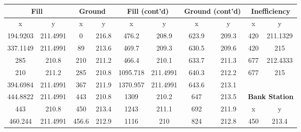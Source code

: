 \begin{center}
\begin{tabular}{|cccc||cccc||cc|} 
    \hline
    \multicolumn{2}{|c}{\textbf{Fill}} & \multicolumn{2}{c||}{\textbf{Ground}} & \multicolumn{2}{c}{\textbf{Fill (cont'd)}} & \multicolumn{2}{c||}{\textbf{Ground (cont'd)}} & \multicolumn{2}{c|}{\textbf{Inefficiency}}    \\ 
    \hline
    x        & y                       & x     & y                            & x        & y                      & x     & y                            & x        & y                                  \\
    194.9203 & 211.4991                & 0     & 216.8                        & 476.2    & 208.9                  & 623.9 & 209.3                        & 420      & 211.1329                           \\
    337.1149 & 211.4991                & 89    & 213.6                        & 469.7    & 209.3                  & 630.5 & 209.6                        & 420      & 215                                \\
    285      & 210.8                   & 210   & 211.2                        & 466.4    & 210.1                  & 633.7 & 211.3                        & 677      & 212.4333                           \\
    210      & 211.2                   & 285   & 210.8                        & 1095.718 & 211.4991               & 640.3 & 212.2                        & 677      & 215                                \\
    394.6984 & 211.4991                & 367   & 211.9                        & 1370.957 & 211.4991               & 643.6 & 213.1                        &          &                                    \\
    444.8822 & 211.4991                & 443   & 210.8                        & 1309     & 210.2                  & 647   & 213.5                        & \multicolumn{2}{c|}{\textbf{Bank Station}}    \\ 
    \cline{9-10}
    443      & 210.8                   & 450   & 213.4                        & 1243     & 211.1                  & 692   & 211.9                        & x        & y                                  \\
    460.244  & 211.4991                & 456.6 & 212.9                        & 1116     & 210                    & 824   & 212.8                        & 450      & 213.4                              \\

\end{tabular}
\end{center}
